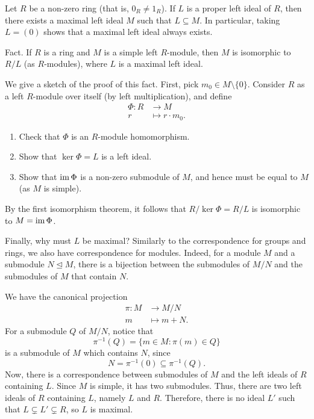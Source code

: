 \begin{exercise}{}
Let $R$ be a non-zero ring (that is, $0_R \neq 1_R$). If $L$ is a proper left ideal of $R$, then 
there exists a maximal left ideal $M$ such that $L \subseteq M$. In particular, taking 
$L = (0)$ shows that a maximal left ideal always exists. 
\end{exercise}

{\sc Fact.} If $R$ is a ring and $M$ is a simple left $R$-module, then $M$ is isomorphic to 
$R/L$ (as $R$-modules), where $L$ is a maximal left ideal. 

We give a sketch of the proof of this fact. First, pick $m_0 \in M \setminus \{0\}$. Consider 
$R$ as a left $R$-module over itself (by left multiplication), and define 
\begin{align*}
    \Phi : R &\to M \\ r &\mapsto r \cdot m_0. 
\end{align*}
\begin{enumerate}[(1)]
    \item Check that $\Phi$ is an $R$-module homomorphism. 
    \item Show that $\ker\Phi = L$ is a left ideal.
    \item Show that $\operatorname{im}\Phi$ is a non-zero submodule of $M$, and hence must be equal to $M$ 
    (as $M$ is simple).
\end{enumerate}
By the first isomorphism theorem, it follows that $R/\ker\Phi = R/L$ is isomorphic to $M = \operatorname{im}\Phi$. 

Finally, why must $L$ be maximal? Similarly to the correspondence for groups and rings, we also have 
correspondence for modules. Indeed, for a module $M$ and a submodule $N \trianglelefteq M$, there 
is a bijection between the submodules of $M/N$ and the submodules of $M$ that contain $N$. 

We have the canonical projection 
\begin{align*}
    \pi : M &\to M/N \\ m &\mapsto m + N.
\end{align*} 
For a submodule $Q$ of $M/N$, notice that 
\[ \pi^{-1}(Q) = \{m \in M : \pi(m) \in Q\} \] 
is a submodule of $M$ which contains $N$, since 
\[ N = \pi^{-1}(0) \subseteq \pi^{-1}(Q). \]
Now, there is a correspondence between submodules of $M$ and the left ideals of $R$ containing $L$. 
Since $M$ is simple, it has two submodules. Thus, there are two left ideals of $R$ containing $L$, namely $L$ and $R$. Therefore, there is no ideal $L'$ such that $L \subsetneq L' \subsetneq R$, so $L$ is 
maximal.


